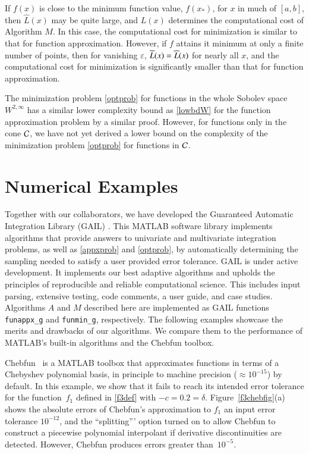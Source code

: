 \documentclass[review]{elsarticle}
\theoremstyle{definition}
\renewcommand{\cw}{W}
\newcommand{\chL}{\widehat{L}}
\newtheorem{exmp}{Example}
\newcommand{\funappxg}{\texttt{funappx\_g}\xspace}
\newcommand{\funming}{\texttt{funmin\_g}\xspace}
\begin{document}
If $f(x)$ is close to the minimum function value, $f(x_*)$, for $x$ in much of
$[a,b]$, then $\chL(x)$ may be quite large, and $L(x)$  determines the
computational cost of Algorithm $M$. In this case, the computational cost for
minimization is similar to that for function approximation. However, if $f$ attains it 
minimum at only a finite number of points, then for vanishing $\varepsilon$, 
$\widetilde{L}(x) = \widehat{L}(x)$ for nearly all $x$, and the computational cost for minimization 
is significantly smaller than that for function approximation.


The minimization problem \eqref{optprob} for functions in the whole Sobolev
space $\cw^{2,\infty}$ has a similar lower complexity bound as \eqref{lowbdW}
for the function approximation problem by a similar proof. However, for
functions only in the cone $\mathcal{C}$, we have not yet derived a lower bound on the
complexity of the minimization problem \eqref{optprob} for functions in $\mathcal{C}$.

\section{Numerical Examples} \label{sec:examples}

Together with our collaborators, we have developed the Guaranteed Automatic
Integration Library (GAIL) \cite{ChoEtal15a}. This MATLAB software library
implements algorithms that provide answers to univariate and multivariate
integration problems, as well as \eqref{appxprob} and \eqref{optprob}, by
automatically determining the sampling needed to satisfy a user provided error
tolerance. GAIL is under active development. It implements our best adaptive
algorithms and upholds the principles of reproducible and reliable computational
science. This includes input parsing, extensive testing, code comments, a user
guide, and case studies. Algorithms $A$ and $M$ described here are implemented
as GAIL functions \funappxg{} and \funming, respectively. The following examples
showcase the merits and drawbacks of our algorithms. We compare them to the
performance of MATLAB's built-in algorithms and the Chebfun toolbox.

Chebfun~\cite{TrefEtal16a} is a MATLAB toolbox that approximates functions in
terms of a Chebyshev polynomial basis, in principle to machine precision
($\approx 10^{-15}$) by default. In this example, we show that it fails to reach
its intended error tolerance for the function~$f_1$ defined in \eqref{f3def} 
with $-c = 0.2 = \delta$.
Figure~\ref{f3chebfig}(a) shows the absolute errors of Chebfun's approximation to
$f_1$  an input error tolerance $10^{-12}$, and the ``splitting''' option  turned on to allow
Chebfun to construct a piecewise polynomial interpolant if derivative
discontinuities are detected.  However, Chebfun produces errors greater 
than~$10^{-5}$.
\end{document}
